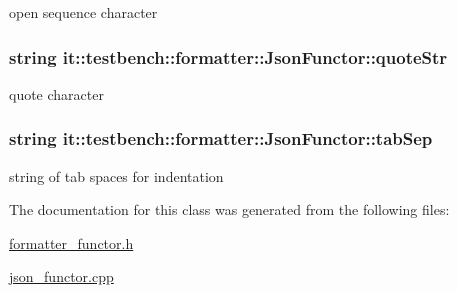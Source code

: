 open sequence character \hypertarget{classit_1_1testbench_1_1formatter_1_1JsonFunctor_a1788b787a9482269eaa271f0f4cd35fd}{
\subsubsection[{quote\-Str}]{\setlength{\rightskip}{0pt plus 5cm}string it\-::testbench\-::formatter\-::\-Json\-Functor\-::quote\-Str\hspace{0.3cm}{\ttfamily [private]}}}\label{d0/def/classit_1_1testbench_1_1formatter_1_1JsonFunctor_a1788b787a9482269eaa271f0f4cd35fd}
quote character \hypertarget{classit_1_1testbench_1_1formatter_1_1JsonFunctor_a7ef70a8a6d49ec93222240ff5a61ce66}{
\subsubsection[{tab\-Sep}]{\setlength{\rightskip}{0pt plus 5cm}string it\-::testbench\-::formatter\-::\-Json\-Functor\-::tab\-Sep\hspace{0.3cm}{\ttfamily [private]}}}\label{d0/def/classit_1_1testbench_1_1formatter_1_1JsonFunctor_a7ef70a8a6d49ec93222240ff5a61ce66}
string of tab spaces for indentation 

The documentation for this class was generated from the following files\-:\begin{DoxyCompactItemize}
\item 
\hyperlink{formatter__functor_8h}{formatter\-\_\-functor.\-h}\item 
\hyperlink{json__functor_8cpp}{json\-\_\-functor.\-cpp}\end{DoxyCompactItemize}
